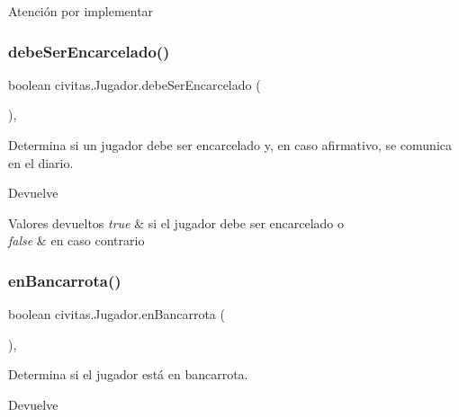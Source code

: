 \begin{DoxyWarning}{Atención}
por implementar 
\end{DoxyWarning}
\mbox{\label{classcivitas_1_1Jugador_af79b45017fa40c343ea072a30e9578d4}} 
\subsubsection{\texorpdfstring{debe\+Ser\+Encarcelado()}{debeSerEncarcelado()}}
{\footnotesize\ttfamily boolean civitas.\+Jugador.\+debe\+Ser\+Encarcelado (\begin{DoxyParamCaption}{ }\end{DoxyParamCaption})\hspace{0.3cm}{\ttfamily [inline]}, {\ttfamily [protected]}}

Determina si un jugador debe ser encarcelado y, en caso afirmativo, se comunica en el diario. \begin{DoxyReturn}{Devuelve}

\end{DoxyReturn}

\begin{DoxyRetVals}{Valores devueltos}
{\em true} & si el jugador debe ser encarcelado o \\
\hline
{\em false} & en caso contrario \\
\hline
\end{DoxyRetVals}
\mbox{\label{classcivitas_1_1Jugador_a00dffd4d41a489e824816f7fece988fc}} 
\subsubsection{\texorpdfstring{en\+Bancarrota()}{enBancarrota()}}
{\footnotesize\ttfamily boolean civitas.\+Jugador.\+en\+Bancarrota (\begin{DoxyParamCaption}{ }\end{DoxyParamCaption})\hspace{0.3cm}{\ttfamily [inline]}, {\ttfamily [package]}}

Determina si el jugador está en bancarrota. \begin{DoxyReturn}{Devuelve}

\end{DoxyReturn}

